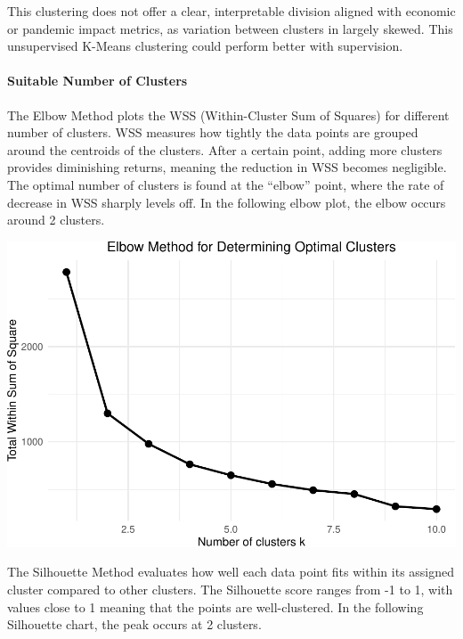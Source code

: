 \documentclass[
]{article}
\begin{document}
\vspace{5pt}

This clustering does not offer a clear, interpretable division aligned
with economic or pandemic impact metrics, as variation between clusters
in largely skewed. This unsupervised K-Means clustering could perform
better with supervision.

\paragraph{Suitable Number of
Clusters}\label{suitable-number-of-clusters}

The Elbow Method plots the WSS (Within-Cluster Sum of Squares) for
different number of clusters. WSS measures how tightly the data points
are grouped around the centroids of the clusters. After a certain point,
adding more clusters provides diminishing returns, meaning the reduction
in WSS becomes negligible. The optimal number of clusters is found at
the ``elbow'' point, where the rate of decrease in WSS sharply levels
off. In the following elbow plot, the elbow occurs around 2 clusters.

\vspace{10pt}

\includegraphics{Final-Report_files/figure-latex/k-means optimal cluster-1.pdf}


\vspace{10pt}

The Silhouette Method evaluates how well each data point fits within its
assigned cluster compared to other clusters. The Silhouette score ranges
from -1 to 1, with values close to 1 meaning that the points are
well-clustered. In the following Silhouette chart, the peak occurs at 2
clusters.
\end{document}

